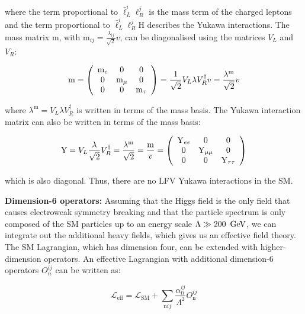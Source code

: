 where the term proportional to $\bar{\ell}_{L}^{i} \ell_{R}^{j}$ is the mass term of the charged leptons and the term proportional to $\bar{\ell}_{L}^{i} \ell_{R}^{j} \text{H}$ describes the Yukawa interactions. The mass matrix m, with $\text{m}_{ij}=\frac{\lambda_{ij}}{\sqrt{2}} v$, can be diagonalised using the matrices $V_{L}$ and $V_{R}$:

\begin{equation}
  \text{m} = \left(\begin{array}{ccc}
  \text{m}_{e} & 0 & 0 \\
  0 & \text{m}_{\mu} & 0 \\
  0 & 0 & \text{m}_{\tau}
  \end{array}\right)=\frac{1}{\sqrt{2}} V_{L} \lambda V_{R}^{\dagger} v=\frac{\lambda^{\text{m}}}{\sqrt{2}} v
\end{equation}

where $\lambda^{\text{m}}=V_{L} \lambda V_{R}^{\dagger}$ is written in terms of the mass basis. The Yukawa interaction matrix can also be written in terms of the mass basis:

\begin{equation}
  \text{Y}=V_{L} \frac{\lambda}{\sqrt{2}} V_{R}^{\dagger}=\frac{\lambda^{\text{m}}}{\sqrt{2}}=\frac{\text{m}}{v}=\left(\begin{array}{ccc}
  \text{Y}_{\textit{e}\textit{e}} & 0 & 0 \\
  0 & \text{Y}_{\mu\mu} & 0 \\
  0 & 0 & \text{Y}_{\tau\tau}
  \end{array}\right)
\end{equation}

which is also diagonal. Thus, there are no LFV Yukawa interactions in the SM.

\textbf{Dimension-6 operators:} Assuming that the Higgs field is the only field that causes electroweak symmetry breaking and that the particle spectrum is only composed of the SM particles up to an energy scale $\Lambda \gg 200~\,\text{Ge\hspace{-.08em}V}$, we can integrate out the additional heavy fields, which gives us an effective field theory. The SM Lagrangian, which has dimension four, can be extended with higher-dimension operators. An effective Lagrangian with additional dimension-6 operators $O_{n}^{i j}$ can be written as:

\begin{equation}
  \mathcal{L}_{\text{eff}}=\mathcal{L}_{\text{SM}}+\sum_{\text{n}ij} \frac{\alpha_{\text{n}}^{ij}}{\Lambda^2} O_{\text{n}}^{i j}
\end{equation}

